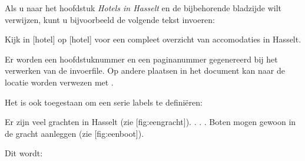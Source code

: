
Als u naar het hoofdstuk {\em Hotels in Hasselt} en de
bijbehorende bladzijde wilt verwijzen, kunt u bijvoorbeeld
de volgende tekst invoeren:

\startbuffer
Kijk in [hotel] op [hotel] voor een
compleet overzicht van  accomodaties in
\paginareferentie[accomodaties]Hasselt.
\stopbuffer

\typebuffer

Er worden een hoofdstuknummer en een paginanummer
gegenereerd bij het verwerken van de invoerfile. Op andere
plaatsen in het document kan naar de locatie
 worden verwezen met
.

Het is ook toegestaan om een serie labels te defini\"eren:

\startbuffer
{}
  {\externfiguur[ma-cb-08][breedte=10cm]}

Er zijn veel grachten in Hasselt (zie [fig:eengracht]).
.
.
.
Boten mogen gewoon in de gracht aanleggen (zie
[fig:eenboot]).
\stopbuffer

\typebuffer

Dit wordt:

\haalbuffer

\stoponderdeel
